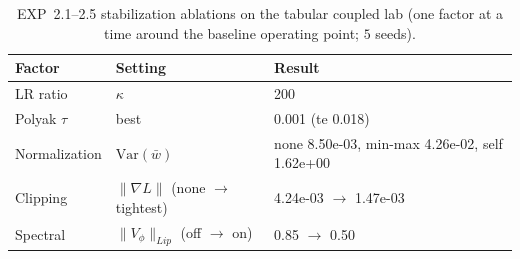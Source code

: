 \begin{table}[htbp]
\centering
\caption{EXP~2.1--2.5 stabilization ablations on the tabular coupled lab (one factor at a time around the baseline operating point; $5$ seeds).}
\label{tab:h21}
\begin{tabular}{lll}
\toprule
Factor & Setting & Result \\
\midrule
LR ratio & $\kappa$ & 200 \\
Polyak $\tau$ & best & 0.001 (te 0.018) \\
Normalization & $\mathrm{Var}(\bar w)$ & none 8.50e-03, min-max 4.26e-02, self 1.62e+00 \\
Clipping & $\|\nabla L\|$ (none $\to$ tightest) & 4.24e-03 $\to$ 1.47e-03 \\
Spectral & $\|V_\phi\|_{Lip}$ (off $\to$ on) & 0.85 $\to$ 0.50 \\
\bottomrule
\end{tabular}
\end{table}
